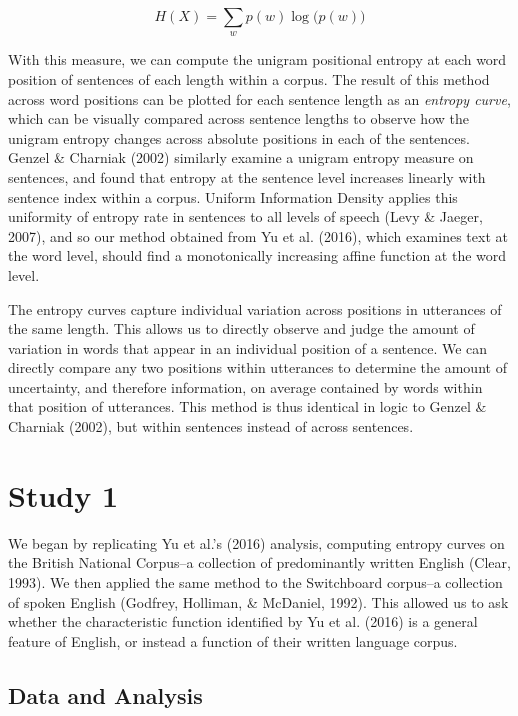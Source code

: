 \documentclass[10pt, letterpaper]{article}
\begin{document}
\[H(X) = \sum\limits_w p(w)\log\big(p(w)\big)\]

With this measure, we can compute the unigram positional entropy at each
word position of sentences of each length within a corpus. The result of
this method across word positions can be plotted for each sentence
length as an \emph{entropy curve}, which can be visually compared across
sentence lengths to observe how the unigram entropy changes across
absolute positions in each of the sentences. Genzel \& Charniak (2002)
similarly examine a unigram entropy measure on sentences, and found that
entropy at the sentence level increases linearly with sentence index
within a corpus. Uniform Information Density applies this uniformity of
entropy rate in sentences to all levels of speech (Levy \& Jaeger,
2007), and so our method obtained from Yu et al. (2016), which examines
text at the word level, should find a monotonically increasing affine
function at the word level.

The entropy curves capture individual variation across positions in
utterances of the same length. This allows us to directly observe and
judge the amount of variation in words that appear in an individual
position of a sentence. We can directly compare any two positions within
utterances to determine the amount of uncertainty, and therefore
information, on average contained by words within that position of
utterances. This method is thus identical in logic to Genzel \& Charniak
(2002), but within sentences instead of across sentences.

\hypertarget{study-1}{%
\section{Study 1}\label{study-1}}

We began by replicating Yu et al.'s (2016) analysis, computing entropy
curves on the British National Corpus--a collection of predominantly
written English (Clear, 1993). We then applied the same method to the
Switchboard corpus--a collection of spoken English (Godfrey, Holliman,
\& McDaniel, 1992). This allowed us to ask whether the characteristic
function identified by Yu et al. (2016) is a general feature of English,
or instead a function of their written language corpus.

\hypertarget{data-and-analysis}{%
\subsection{Data and Analysis}\label{data-and-analysis}}
\end{document}
